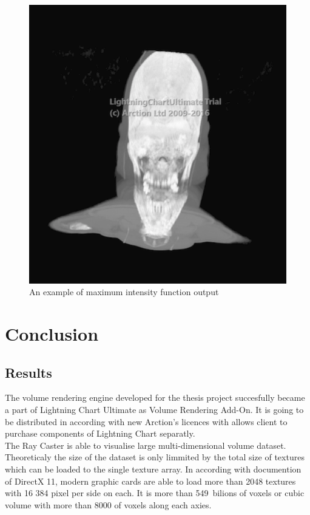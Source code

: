 \documentclass[twoside, english, 11pt]{report}
\begin{document}
\begin{figure}[!h]
\centerline{\includegraphics[scale = 0.6]{img/maxi}}
\caption{An example of maximum intensity function output\label{fig:maxi}}
\end{figure}





\chapter{Conclusion}
\section{Results}
The volume rendering engine developed for the thesis project succesfully became a part of Lightning Chart Ultimate as Volume Rendering Add-On. It is going to be distributed in according with new Arction's licences with allows client to purchase components of Lightning Chart separatly.\\

The Ray Caster is able to visualise large multi-dimensional volume dataset. Theoreticaly the size of the dataset is only limmited by the total size of textures which can be loaded to the single texture array. In according with documention of DirectX 11, modern graphic cards are able to load more than 2048 textures with 16 384 pixel per side on each. It is more than 549 bilions of voxels or cubic volume with more than 8000 of voxels along each axies.\\
\end{document}
